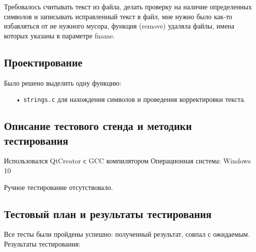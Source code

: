 \documentclass[12pt,a4paper]{report}
\begin{document}
Требовалось считывать текст из файла, делать проверку на наличие определенных символов и записывать исправленный текст в файл, мне нужно было как-то избавляться от не нужного мусора, функция (remove) удаляла файлы, имена которых указаны в параметре fname.

\subsection{Проектирование}

Было решено выделить одну функцию:
\begin{enumerate}
\item[•] \verb-strings.c- для нахождения символов и проведения корректировки текста.
\end{enumerate}


\subsection{Описание тестового стенда и методики тестирования}

Использовался QtCreator с GCC компилятором
Операционная система: Windows 10


Ручное тестирование отсутствовало.

\subsection{Тестовый план и результаты тестирования}
Все тесты были пройдены успешно: полученный результат, совпал с ожидаемым. Результаты тестирования:
\end{document}
